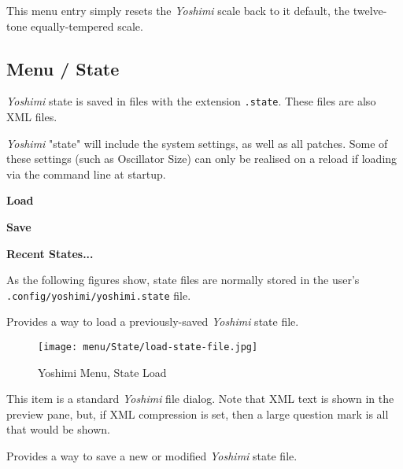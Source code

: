    This menu entry simply resets the \textsl{Yoshimi} scale back to it default,
   the twelve-tone equally-tempered scale.

\subsection{Menu / State}
\label{subsec:menu_state}

   \textsl{Yoshimi} state is saved in files with the extension
   \texttt{.state}.  These files are also XML files.

   \textsl{Yoshimi} "state" will include the system settings, as well as all
   patches. Some of these settings (such as Oscillator Size) can only be
   realised on a reload if loading via the command line at startup.


   \begin{enumber}
      \item \textbf{Load}
      \item \textbf{Save}
      \item \textbf{Recent States...}
   \end{enumber}

   As the following figures show, state files are normally stored in the
   user's \texttt{.config/yoshimi/yoshimi.state} file.

   \setcounter{ItemCounter}{0}      %

   Provides a way to load a previously-saved \textsl{Yoshimi} state file.

\begin{figure}[H]
   \centering 
   \texttt{[image: menu/State/load-state-file.jpg]}
   \caption{Yoshimi Menu, State Load}
   \label{fig:yoshimi_menu_state_load}
\end{figure}

   This item is a standard \textsl{Yoshimi} file dialog.
   Note that XML text is shown in the preview pane, but, if XML compression is
   set, then a large question mark is all that would be shown.

   Provides a way to save a new or modified \textsl{Yoshimi} state file.

